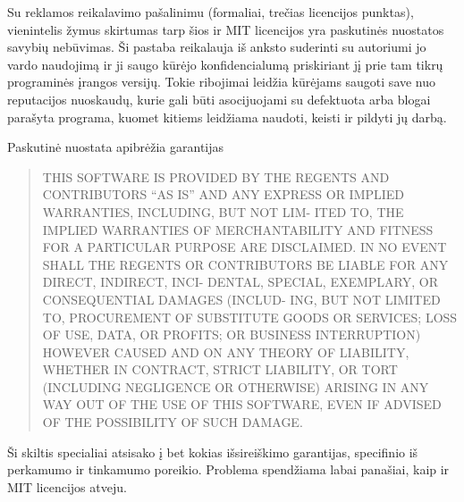 Su reklamos reikalavimo pašalinimu (formaliai, trečias licencijos punktas), vienintelis žymus skirtumas tarp šios ir MIT licencijos yra paskutinės nuostatos savybių nebūvimas. 
Ši pastaba reikalauja iš anksto suderinti su autoriumi jo vardo naudojimą ir ji saugo kūrėjo konfidencialumą priskiriant jį prie tam tikrų programinės įrangos versijų.
Tokie ribojimai leidžia kūrėjams saugoti save nuo reputacijos nuoskaudų, kurie gali būti asocijuojami su defektuota arba blogai parašyta programa, kuomet kitiems leidžiama naudoti, keisti ir pildyti jų darbą.

Paskutinė nuostata apibrėžia garantijas

\begin{quote}
    THIS SOFTWARE IS PROVIDED BY THE REGENTS AND CONTRIBUTORS “AS IS” AND ANY EXPRESS OR IMPLIED WARRANTIES, INCLUDING, BUT NOT LIM- ITED TO, THE IMPLIED WARRANTIES OF MERCHANTABILITY AND FITNESS FOR A PARTICULAR PURPOSE ARE DISCLAIMED. IN NO EVENT SHALL THE REGENTS OR CONTRIBUTORS BE LIABLE FOR ANY DIRECT, INDIRECT, INCI- DENTAL, SPECIAL, EXEMPLARY, OR CONSEQUENTIAL DAMAGES (INCLUD- ING, BUT NOT LIMITED TO, PROCUREMENT OF SUBSTITUTE GOODS OR SERVICES; LOSS OF USE, DATA, OR PROFITS; OR BUSINESS INTERRUPTION) HOWEVER CAUSED AND ON ANY THEORY OF LIABILITY, WHETHER IN CONTRACT, STRICT LIABILITY, OR TORT (INCLUDING NEGLIGENCE OR OTHERWISE) ARISING IN ANY WAY OUT OF THE USE OF THIS SOFTWARE, EVEN IF ADVISED OF THE POSSIBILITY OF SUCH DAMAGE.
\end{quote}

Ši skiltis specialiai atsisako į bet kokias išsireiškimo garantijas, specifinio iš perkamumo ir tinkamumo poreikio.
Problema spendžiama labai panašiai, kaip ir MIT licencijos atveju.





